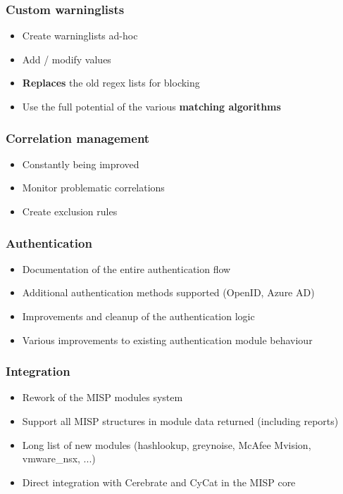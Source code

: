 \begin{frame}
\frametitle{Custom warninglists}
\begin{itemize}
	\item Create warninglists ad-hoc
        \item Add / modify values
        \item {\bf Replaces} the old regex lists for blocking
        \item Use the full potential of the various {\bf matching algorithms}
\end{itemize}
\end{frame}

\begin{frame}
\frametitle{Correlation management}
\begin{itemize}
	\item Constantly being improved
        \item Monitor problematic correlations
        \item Create exclusion rules
\end{itemize}
\end{frame}

\begin{frame}
\frametitle{Authentication}
\begin{itemize}
	\item Documentation of the entire authentication flow
        \item Additional authentication methods supported (OpenID, Azure AD)
        \item Improvements and cleanup of the authentication logic
        \item Various improvements to existing authentication module behaviour
\end{itemize}
\end{frame}

\begin{frame}
\frametitle{Integration}
\begin{itemize}
	\item Rework of the MISP modules system
        \item Support all MISP structures in module data returned (including reports)
        \item Long list of new modules (hashlookup, greynoise, McAfee Mvision, vmware\_nsx, ...)
        \item Direct integration with Cerebrate and CyCat in the MISP core
\end{itemize}
\end{frame}

